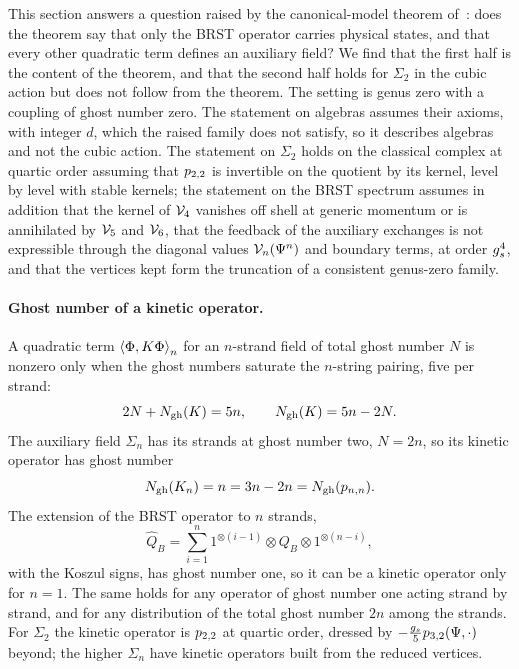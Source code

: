 \noindent{}
This section answers a question raised by the canonical-model theorem of~\cite{Cieliebak:2015:HomologicalAlgebraRelated}: does the theorem say that only the BRST operator carries physical states, and that every other quadratic term defines an auxiliary field?
We find that the first half is the content of the theorem, and that the second half holds for $\Sigma_2$ in the cubic action but does not follow from the theorem.
The setting is genus zero with a coupling of ghost number zero.
The statement on \IBL{} algebras assumes their axioms, with integer $d$, which the raised family does not satisfy, so it describes \IBL{} algebras and not the cubic action.
The statement on $\Sigma_2$ holds on the classical complex at quartic order assuming that $\sprod{2}{2}$ is invertible on the quotient by its kernel, level by level with stable kernels; the statement on the BRST spectrum assumes in addition that the kernel of $\vertex{4}$ vanishes off shell at generic momentum or is annihilated by $\vertex{5}$ and $\vertex{6}$, that the feedback of the auxiliary exchanges is not expressible through the diagonal values $\vertex{n}(\Psi^n)$ and boundary terms, at order $\gs^4$, and that the vertices kept form the truncation of a consistent genus-zero \Loo{} family.

\paragraph{Ghost number of a kinetic operator.}

A quadratic term $\pair[n]{\Phi}{K \Phi}$ for an $n$-strand field of total ghost number $N$ is nonzero only when the ghost numbers saturate the $n$-string pairing, five per strand:
\begin{equation}
  \label{ch11:eq:kinetic-balance}
  2 N + \Ngh(K)
    = 5 n,
  \qquad
  \Ngh(K)
    = 5 n - 2 N.
\end{equation}
The auxiliary field $\Sigma_n$ has its strands at ghost number two, $N = 2 n$, so its kinetic operator has ghost number
\begin{equation}
  \label{ch11:eq:kinetic-n}
  \Ngh(K_n)
    = n
    = 3 n - 2 n
    = \Ngh(\sprod{n}{n}).
\end{equation}
The extension of the BRST operator to $n$ strands,
\begin{equation}
  \hat{Q}_B
    = \sum_{i = 1}^n 1^{\otimes (i - 1)} \otimes Q_B \otimes 1^{\otimes (n - i)},
\end{equation}
with the Koszul signs, has ghost number one, so it can be a kinetic operator only for $n = 1$.
The same holds for any operator of ghost number one acting strand by strand, and for any distribution of the total ghost number $2 n$ among the strands.
For $\Sigma_2$ the kinetic operator is $\sprod{2}{2}$ at quartic order, dressed by $- \tfrac{\gs}{5} \sprod{3}{2}(\Psi, \cdot)$ beyond; the higher $\Sigma_n$ have kinetic operators built from the reduced vertices.


